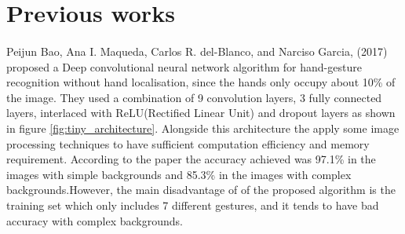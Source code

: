\documentclass[12pt]{report}
\begin{document}
        \section{Previous works}
            \paragraph{}
                Peijun Bao, Ana I. Maqueda, Carlos R. del-Blanco, and Narciso Garcia, 
                (2017) proposed a Deep convolutional neural network algorithm for hand-gesture 
                recognition without hand localisation, since the hands only occupy about 10\% of 
                the image. They used a combination of 9 convolution layers, 3 fully connected layers, 
                interlaced with ReLU(Rectified Linear Unit) and dropout layers as shown in 
                figure \ref{fig:tiny_architecture}. Alongside this architecture the apply some image 
                processing techniques to have sufficient computation efficiency and memory requirement.
                According to the paper the accuracy achieved was 97.1\% in the images with simple backgrounds
                and 85.3\% in the images with complex backgrounds.However, the main disadvantage of of 
                the proposed algorithm is the training set which only includes 7 different gestures,
                and it tends to have bad accuracy with complex backgrounds.
             
\end{document}
